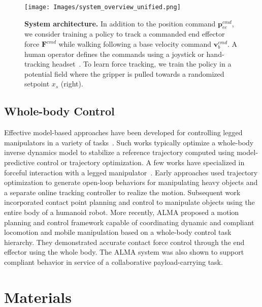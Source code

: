 \begin{figure}[t!]
\centering
\vspace{0.2cm}
\texttt{[image: Images/system\_overview\_unified.png]}
\caption{\textbf{System architecture.} In addition to the position command $\textbf{p}_{ee}^{cmd}$, we consider training a policy to track a commanded end effector force $\textbf{F}^{cmd}$ while walking following a base velocity command $\textbf{v}_{b}^{cmd}$. A human operator defines the commands using a joystick or hand-tracking headset~\cite{park2024avp}. To learn force tracking, we train the policy in a potential field where the gripper is pulled towards a randomized setpoint $x_s$ (right).}
\label{fig:system_diagram}
\end{figure}

\subsection{Whole-body Control}

Effective model-based approaches have been developed for controlling legged manipulators in a variety of tasks~\cite{dai2014whole, sentis2005synthesis, posa2014direct, sleiman2021unified, polverini2020multi, murphy2012high, murooka2015whole, rehman2016towards, bellicoso2019alma, risiglione2022whole, sleiman2023versatile}. Such works typically optimize a whole-body inverse dynamics model to stabilize a reference trajectory computed using model-predictive control or trajectory optimization. A few works have specialized in forceful interaction with a legged manipulator~\cite{murphy2012high, murooka2015whole, rehman2016towards, bellicoso2019alma, risiglione2022whole}. Early approaches \cite{murphy2012high} used trajectory optimization to generate open-loop behaviors for manipulating heavy objects and a separate online tracking controller to realize the motion. Subsequent work \cite{murooka2015whole} incorporated contact point planning and control to manipulate objects using the entire body of a humanoid robot. More recently, ALMA \cite{bellicoso2019alma} proposed a motion planning and control framework capable of coordinating dynamic and compliant locomotion and mobile manipulation based on a whole-body control task hierarchy. They demonstrated accurate contact force control through the end effector using the whole body. The ALMA system was also shown to support compliant behavior in service of a collaborative payload-carrying task. 


\section{Materials}


